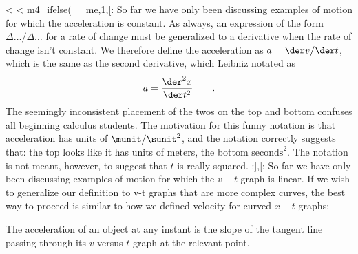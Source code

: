 <%
<%
m4_ifelse(__me,1,[:
So far we have only been discussing examples of motion for
which the acceleration is constant. As always, an expression of the
form $\Delta\ldots/\Delta\ldots$ for a rate of change must be generalized
to a derivative when the rate of change isn't constant. We therefore define
the acceleration as $a=\der v/\der t$, which is the same as the second
derivative, which Leibniz notated as
\begin{equation*}
  a = \frac{\der^2 x}{\der t^2} \qquad .
\end{equation*}
The seemingly inconsistent placement of the twos on the top
and bottom confuses all beginning calculus students. The
motivation for this funny notation is that acceleration has
units of $\munit/\sunit^2$, and the notation correctly suggests that:
the top looks like it has units of meters, the bottom
$\text{seconds}^2$. The notation is not meant, however, to suggest
that $t$ is really squared.
:],[:%
So far we have only been discussing examples of motion for
which the $v-t$ graph is linear. If we wish to generalize
our definition to v-t graphs that are more complex curves,
the best way to proceed is similar to how we defined
velocity for curved $x-t$ graphs:

\begin{lessimportant}
The acceleration of an object at any instant is the slope of
the tangent line passing through its $v$-versus-$t$ graph
at the relevant point.
\end{lessimportant}

